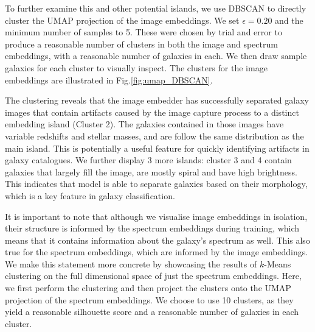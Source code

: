 \documentclass[draft, a4paper,12pt]{article}
\begin{document}
To further examine this and other potential islands, we use DBSCAN to directly cluster the UMAP projection of the image embeddings. We set $\epsilon = 0.20$ and the minimum number of samples to 5. These were chosen by trial and error to produce a reasonable number of clusters in both the image and spectrum embeddings, with a reasonable number of galaxies in each. We then draw sample galaxies for each cluster to visually inspect. The clusters for the image embeddings are illustrated in Fig.\ref{fig:umap_DBSCAN}.

The clustering reveals that the image embedder has successfully separated galaxy images that contain artifacts caused by the image capture process to a distinct embedding island (Cluster 2). The galaxies contained in those images have variable redshifts and stellar masses, and are follow the same distribution as the main island. This is potentially a useful feature for quickly identifying artifacts in galaxy catalogues. We further display 3 more islands: cluster 3 and 4 contain galaxies that largely fill the image, are mostly spiral and have high brightness. This indicates that model is able to separate galaxies based on their morphology, which is a key feature in galaxy classification. 

It is important to note that although we visualise image embeddings in isolation, their structure is informed by the spectrum embeddings during training, which means that it contains information about the galaxy's spectrum as well. This also true for the spectrum embeddings, which are informed by the image embeddings. We make this statement more concrete by showcasing the results of $k$-Means clustering on the full dimensional space of just the spectrum embeddings. Here, we first perform the clustering and then project the clusters onto the UMAP projection of the spectrum embeddings. We choose to use 10 clusters, as they yield a reasonable silhouette score and a reasonable number of galaxies in each cluster. 
\end{document}
